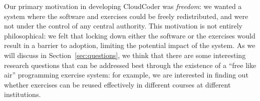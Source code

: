 \documentclass{sig-alternate}
\begin{document}
%
%
%
%

Our primary motivation in developing CloudCoder
was {\em freedom}: we wanted a system where
the software and exercises could be freely redistributed, and
were not under the control of any central authority.  This motivation
is not entirely philosophical: we felt that locking down either
the software or the exercises would result in a barrier to adoption,
limiting the potential impact of the system.
As we will discuss in Section~\ref{sec:questions}, we think that there
are some interesting research questions that can be addressed
best through the existence of a ``free like air'' programming
exercise system: for example, we are interested in finding out
whether exercises can be reused effectively in different courses
at different institutions.
\end{document}
